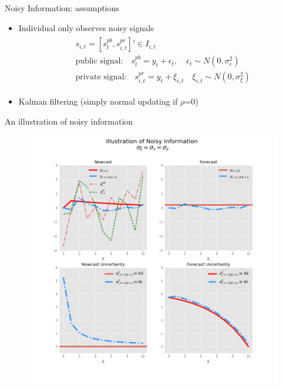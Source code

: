\documentclass{beamer}
\begin{document}
\begin{frame}{Noisy Information: assumptions}
\begin{itemize}
\item Individual only observes noisy signals 
\begin{eqnarray*}
	\begin{aligned}
		& s_{i,t}=[s^{pb}_t, s^{pr}_{i,t}]' \in I_{i,t} \\
		&\text{public signal:} \quad s^{pb}_t = y_t + \epsilon_t, \quad \epsilon_t \sim N(0,\sigma^2_\epsilon)\\ 
		& \text{private signal:} \quad s^{pr}_{i,t} = y_t + \xi_{i,t} \quad \xi_{i,t} \sim N(0,\sigma^2_\xi)
	\end{aligned}
\end{eqnarray*} 

\item Kalman filtering (simply normal updating if $\rho$=0)
\end{itemize}
\end{frame}


\begin{frame}{An illustration of noisy information}


\begin{figure}
	\includegraphics[height=0.8\textheight,width=\textwidth]{figuresDraft/ni_illustration} 
\end{figure}

\end{frame}
\end{document}

